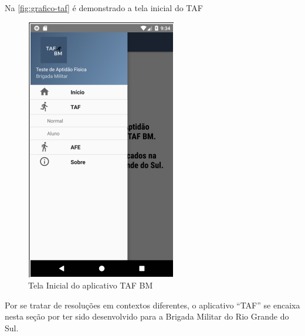 Na \autoref{fig:grafico-taf} é demonstrado a tela inicial do TAF

\begin{figure}[htb]
    \caption{\label{fig:grafico-taf}Tela Inicial do aplicativo TAF BM}
    \begin{center}
        \includegraphics[scale=0.9]{imagens/taf.png}
    \end{center}
\end{figure}
Por se tratar de resoluções em contextos diferentes, o aplicativo ``TAF'' se encaixa nesta seção por ter sido desenvolvido para a Brigada Militar do Rio Grande do Sul.